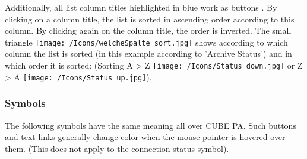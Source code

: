 Additionally, all list column titles highlighted in blue work as buttons . By clicking on a column title, the list is sorted in ascending order according to this column. By clicking again on the column title, the order is inverted. The small triangle \texttt{[image: /Icons/welcheSpalte\_sort.jpg]}  shows according to which column the list is sorted (in this example according to 'Archive Status') and in which order it is sorted: (Sorting A {\textgreater} Z \texttt{[image: /Icons/Status\_down.jpg]} or Z {\textgreater} A \texttt{[image: /Icons/Status\_up.jpg]}).

\pagebreak
\subsubsection{Symbols}
\label{bkm:Ref443039356}
The following symbols have the same meaning all over CUBE PA. Such buttons and text links generally change color when the mouse pointer is hovered over them. (This does not apply to the connection status symbol). 

